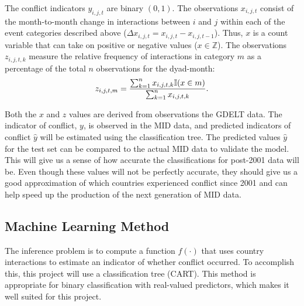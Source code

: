 \documentclass[12pt,letterpaper]{article} %
\begin{document}

The conflict indicators $y_{i,j,t}$ are binary $(0,1)$. The observations $x_{i,j,t}$ consist of the month-to-month change in interactions between $i$ and $j$ within each of the event categories described above ($\Delta x_{i,j,t} = x_{i,j,t} - x_{i,j,t-1}$). Thus, $x$ is a count variable that can take on positive or negative values ($x \in \mathbb{Z}$). The observations $z_{i,j,t,k}$ measure the relative frequency of interactions in category $m$ as a percentage of the total $n$ observations for the dyad-month: 
\begin{eqnarray*}
z_{i,j,t,m} = {\sum_{k=1}^n x_{i,j,t,k} \mathbb{I}(x \in m)  \over \sum_{k=1}^n x_{i,j,t,k} }.
\end{eqnarray*}


Both the $x$ and $z$ values are derived from observations the GDELT data. The indicator of conflict, $y$, is observed in the MID data, and predicted indicators of conflict $\hat{y}$ will be estimated using the classification tree. The predicted values $\hat{y}$ for the test set can be compared to the actual MID data to validate the model. This will give us a sense of how accurate the classifications for post-2001 data will be. Even though these values will not be perfectly accurate, they should give us a good approximation of which countries experienced conflict since 2001 and can help speed up the production of the next generation of MID data. 


\subsection{Machine Learning Method}


The inference problem is to compute a function $f(\cdot)$ that uses country interactions to estimate an indicator of whether conflict occurred. To accomplish this, this project will use a classification tree (CART). This method is appropriate for binary classification with real-valued predictors, which makes it well suited for this project.
\end{document}
